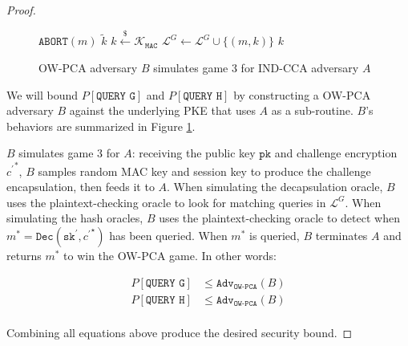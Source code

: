 \documentclass[journal=tches,submission]{iacrtrans}
\newcommand{\decrypt}{\texttt{Dec}}
\newcommand{\mac}{\texttt{MAC}}
\newcommand{\pk}{\texttt{pk}}
\newcommand{\sk}{\texttt{sk}}
\newcommand{\pco}{\texttt{PCO}}
\newcommand{\leftsample}{\stackrel{\$}{\leftarrow}}
\newcommand{\adv}{\texttt{Adv}}
\begin{document}
\begin{proof}
\begin{figure}[h]
\begin{minipage}[t]{0.49\textwidth}
\begin{algorithm}[H]
            \end{algorithm}
            \begin{algorithm}[H]
                \caption*{$\mathcal{O}^G_B(m)$}
                \begin{algorithmic}[1]
                    \If{$\pco(m, {c^\prime}^\ast) = 1$}
                        \State $\texttt{ABORT}(m)$
                    \EndIf
                        \State \Return $\tilde{k}$
                    \EndIf
                    \State $k \leftsample \mathcal{K}_\mac$
                    \State $\mathcal{L}^G \leftarrow \mathcal{L}^G \cup \{(m, k)\}$
                    \State \Return $k$
                \end{algorithmic}
            \end{algorithm}
        \end{minipage}
        \caption{OW-PCA adversary $B$ simulates game 3 for IND-CCA adversary $A$}\label{fig:ow-pca-simulates-game-3}
    \end{figure}

    We will bound $P[\texttt{QUERY G}]$ and $P[\texttt{QUERY H}]$ by constructing a OW-PCA adversary $B$ against the underlying PKE that uses $A$ as a sub-routine. $B$'s behaviors are summarized in Figure \ref{fig:ow-pca-simulates-game-3}.

    $B$ simulates game 3 for $A$: receiving the public key $\pk$ and challenge encryption ${c^\prime}^\ast$, $B$ samples random MAC key and session key to produce the challenge encapsulation, then feeds it to $A$. When simulating the decapsulation oracle, $B$ uses the plaintext-checking oracle to look for matching queries in $\mathcal{L}^G$. When simulating the hash oracles, $B$ uses the plaintext-checking oracle to detect when $m^\ast = \decrypt(\sk^\prime, {c^\prime}^\star)$ has been queried. When $m^\ast$ is queried, $B$ terminates $A$ and returns $m^\ast$ to win the OW-PCA game. In other words:

    \begin{equation*}
        \begin{aligned}
            P\left[\texttt{QUERY G}\right] &\leq \adv_\texttt{OW-PCA}(B) \\
            P\left[\texttt{QUERY H}\right] &\leq \adv_\texttt{OW-PCA}(B) \\
        \end{aligned}
    \end{equation*}

    Combining all equations above produce the desired security bound.
\end{proof}
\end{document}
